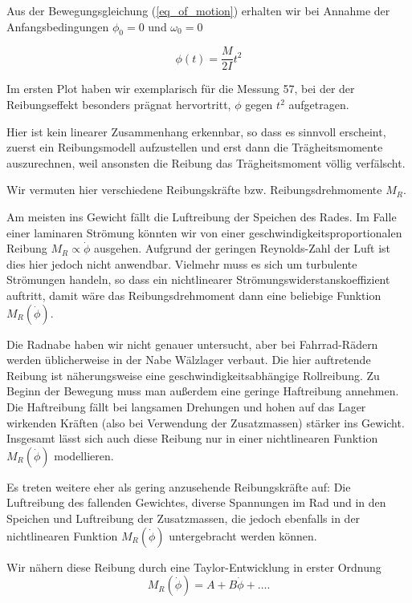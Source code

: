 \documentclass[a4paper,german,12pt,smallheadings]{scrartcl}
\begin{document}
Aus der Bewegungsgleichung (\ref{eq_of_motion}) erhalten wir bei
Annahme der Anfangsbedingungen $\phi_0 = 0$ und $\omega_0 = 0$

\begin{equation}
  \phi(t) = \frac{M}{2I} t^2
\end{equation}

Im ersten Plot haben wir exemplarisch für die Messung 57, bei der der Reibungseffekt
besonders prägnat hervortritt, $\phi$ gegen $t^2$ aufgetragen.

Hier ist kein linearer Zusammenhang erkennbar, so dass es sinnvoll erscheint,
zuerst ein Reibungsmodell aufzustellen und erst dann die Trägheitsmomente
auszurechnen, weil ansonsten die Reibung das Trägheitsmoment völlig verfälscht.

Wir vermuten hier verschiedene Reibungskräfte bzw. Reibungsdrehmomente $M_R$.

Am meisten ins Gewicht fällt die Luftreibung der Speichen des Rades. Im Falle
einer laminaren Strömung könnten wir von einer geschwindigkeitsproportionalen
Reibung $M_R \propto \dot{\phi}$ ausgehen.  Aufgrund der geringen Reynolds-Zahl
der Luft ist dies hier jedoch nicht anwendbar. Vielmehr muss es sich um
turbulente Strömungen handeln, so dass ein nichtlinearer
Strömungswiderstanskoeffizient auftritt, damit wäre das Reibungsdrehmoment dann
eine beliebige Funktion $M_R(\dot{\phi})$.

Die Radnabe haben wir nicht genauer untersucht, aber bei Fahrrad-Rädern werden
üblicherweise in der Nabe Wälzlager verbaut. Die hier auftretende Reibung ist
näherungsweise eine geschwindigkeitsabhängige Rollreibung. Zu Beginn der
Bewegung muss man außerdem eine geringe Haftreibung annehmen. Die Haftreibung
fällt bei langsamen Drehungen und hohen auf das Lager wirkenden Kräften (also
bei Verwendung der Zusatzmassen) stärker ins Gewicht. Insgesamt lässt sich auch
diese Reibung nur in einer nichtlinearen Funktion $M_R(\dot{\phi})$
modellieren.

Es treten weitere eher als gering anzusehende Reibungskräfte auf: Die
Luftreibung des fallenden Gewichtes, diverse Spannungen im Rad und in den
Speichen und Luftreibung der Zusatzmassen, die jedoch ebenfalls in der
nichtlinearen Funktion $M_R(\dot{\phi})$ untergebracht werden können.

Wir nähern diese Reibung durch eine Taylor-Entwicklung in erster Ordnung
\begin{equation}
  M_R(\dot{\phi}) = A + B \dot{\phi} + \dots.
\end{equation}
\end{document}
